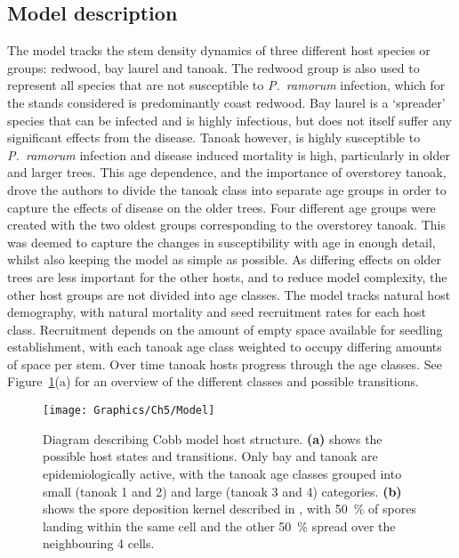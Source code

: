 \subsection{Model description}

The model tracks the stem density dynamics of three different host species or groups: redwood, bay laurel and tanoak. The redwood group is also used to represent all species that are not susceptible to \textit{P.~ramorum} infection, which for the stands considered is predominantly coast redwood. Bay laurel is a `spreader' species that can be infected and is highly infectious, but does not itself suffer any significant effects from the disease. Tanoak however, is highly susceptible to \textit{P.~ramorum} infection and disease induced mortality is high, particularly in older and larger trees. This age dependence, and the importance of overstorey tanoak, drove the authors to divide the tanoak class into separate age groups in order to capture the effects of disease on the older trees. Four different age groups were created with the two oldest groups corresponding to the overstorey tanoak. This was deemed to capture the changes in susceptibility with age in enough detail, whilst also keeping the model as simple as possible. As differing effects on older trees are less important for the other hosts, and to reduce model complexity, the other host groups are not divided into age classes. The model tracks natural host demography, with natural mortality and seed recruitment rates for each host class. Recruitment depends on the amount of empty space available for seedling establishment, with each tanoak age class weighted to occupy differing amounts of space per stem. Over time tanoak hosts progress through the age classes. See Figure~\ref{fig:ch5:model_description}(a) for an overview of the different classes and possible transitions.

\begin{figure}
\centering
    \texttt{[image: Graphics/Ch5/Model]}
    \caption[Mixed stand model structure]{Diagram describing Cobb model host structure. \textbf{(a)} shows the possible host states and transitions. Only bay and tanoak are epidemiologically active, with the tanoak age classes grouped into small (tanoak 1 and 2) and large (tanoak 3 and 4) categories. \textbf{(b)} shows the spore deposition kernel described in \citet{cobb_ecosystem_2012}, with \SI{50}{\percent} of spores landing within the same cell and the other \SI{50}{\percent} spread over the neighbouring 4 cells.\label{fig:ch5:model_description}}
\end{figure}

